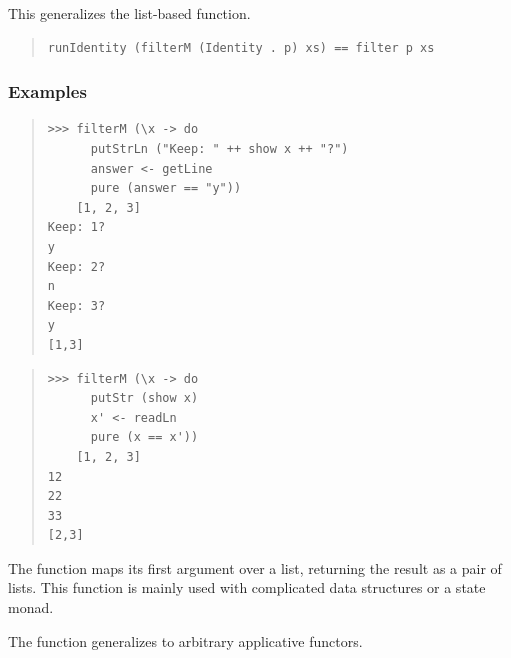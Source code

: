 \begin{haddockdesc}
\item[\begin{tabular}{@{}l}
filterM :: Applicative m => (a -> m Bool) -> {\char 91}a{\char 93} -> m {\char 91}a{\char 93}
\end{tabular}]
{\haddockbegindoc
This generalizes the list-based  function.\par
\begin{quote}
{\haddockverb\begin{verbatim}
runIdentity (filterM (Identity . p) xs) == filter p xs\end{verbatim}}
\end{quote}
\subsubsection*{\textbf{Examples}}
\begin{quote}
{\haddockverb\begin{verbatim}
>>> filterM (\x -> do
      putStrLn ("Keep: " ++ show x ++ "?")
      answer <- getLine
      pure (answer == "y"))
    [1, 2, 3]
Keep: 1?
y
Keep: 2?
n
Keep: 3?
y
[1,3]

\end{verbatim}}
\end{quote}
\begin{quote}
{\haddockverb\begin{verbatim}
>>> filterM (\x -> do
      putStr (show x)
      x' <- readLn
      pure (x == x'))
    [1, 2, 3]
12
22
33
[2,3]

\end{verbatim}}
\end{quote}}
\end{haddockdesc}
\begin{haddockdesc}
\item[\begin{tabular}{@{}l}
mapAndUnzipM :: Applicative m => (a -> m (b, c)) -> {\char 91}a{\char 93} -> m ({\char 91}b{\char 93}, {\char 91}c{\char 93})
\end{tabular}]
{\haddockbegindoc
The  function maps its first argument over a list, returning
 the result as a pair of lists. This function is mainly used with complicated
 data structures or a state monad.\par}
\end{haddockdesc}
\begin{haddockdesc}
\item[\begin{tabular}{@{}l}
zipWithM :: Applicative m => (a -> b -> m c) -> {\char 91}a{\char 93} -> {\char 91}b{\char 93} -> m {\char 91}c{\char 93}
\end{tabular}]
{\haddockbegindoc
The  function generalizes  to arbitrary applicative functors.\par}
\end{haddockdesc}
